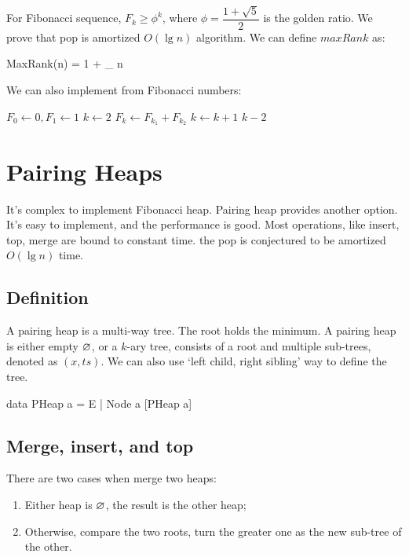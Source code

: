 \documentclass[b5paper]{article}
\begin{document}
For Fibonacci sequence, $F_k \geq \phi^k$, where $\phi = \dfrac{1+\sqrt{5}}{2}$ is the golden ratio. We prove that pop is amortized $O(\lg n)$ algorithm. We can define $maxRank$ as:

\be
  MaxRank(n) = 1 + \lfloor \log_{\phi} n \rfloor
\ee

We can also implement  from Fibonacci numbers:

\begin{algorithmic}[1]
  \State $F_0 \gets 0, F_1 \gets 1$
  \State $k \gets 2$
  \Repeat
    \State $F_k \gets F_{k_1} + F_{k_2}$
    \State $k \gets k + 1$
  \State \Return $k - 2$
\EndFunction
\end{algorithmic}

\section{Pairing Heaps}
\label{pairing-heap} 

It's complex to implement Fibonacci heap. Pairing heap provides another option. It's easy to implement, and the performance is good. Most operations, like insert, top, merge are bound to constant time. the pop is conjectured to be amortized $O(\lg n)$ time\cite{pairing-heap}\cite{okasaki-book}.

\subsection{Definition}

A pairing heap is a multi-way tree. The root holds the minimum. A pairing heap is either empty $\varnothing$, or a $k$-ary tree, consists of a root and multiple sub-trees, denoted as $(x, ts)$. We can also use `left child, right sibling' way to define the tree.

\begin{Haskell}
data PHeap a = E | Node a [PHeap a]
\end{Haskell}

\subsection{Merge, insert, and top}
 

There are two cases when merge two heaps:

\begin{enumerate}
\item Either heap is $\varnothing$, the result is the other heap;
\item Otherwise, compare the two roots, turn the greater one as the new sub-tree of the other.
\end{enumerate}
\end{document}
